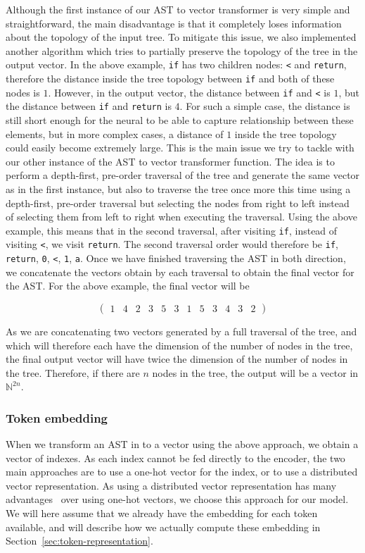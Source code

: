Although the first instance of our AST to vector transformer is very simple and
straightforward, the main disadvantage is that it completely loses information
about the topology of the input tree. To mitigate this issue, we also
implemented another algorithm which tries to partially preserve the topology of
the tree in the output vector. In the above example, \lstinline{if} has two
children nodes: \lstinline{<} and \lstinline{return}, therefore the distance
inside the tree topology between \lstinline{if} and both of these nodes is $1$.
However, in the output vector, the distance between \lstinline{if} and
\lstinline{<} is $1$, but the distance between \lstinline{if} and
\lstinline{return} is $4$. For such a simple case, the distance is still short
enough for the neural to be able to capture relationship between these elements,
but in more complex cases, a distance of $1$ inside the tree topology could
easily become extremely large. This is the main issue we try to tackle with our
other instance of the AST to vector transformer function. The idea is to perform
a depth-first, pre-order traversal of the tree and generate the same vector as
in the first instance, but also to traverse the tree once more this time using a
depth-first, pre-order traversal but selecting the nodes from right to left
instead of selecting them from left to right when executing the traversal. Using
the above example, this means that in the second traversal, after visiting
\lstinline{if}, instead of visiting \lstinline{<}, we visit \lstinline{return}.
The second traversal order would therefore be \lstinline{if},
\lstinline{return}, \lstinline{0}, \lstinline{<}, \lstinline{1}, \lstinline{a}.
Once we have finished traversing the AST in both direction, we concatenate the
vectors obtain by each traversal to obtain the final vector for the AST. For the
above example, the final vector will be

\[ \begin{pmatrix}1 & 4 & 2 & 3 & 5 & 3 & 1 & 5 & 3 & 4 & 3 & 2\end{pmatrix} \]

As we are concatenating two vectors generated by a full traversal of the tree,
and which will therefore each have the dimension of the number of nodes in the
tree, the final output vector will have twice the dimension of the number of
nodes in the tree. Therefore, if there are $n$ nodes in the tree, the output
will be a vector in $\mathbb{N}^{2n}$.
%
\subsubsection{Token embedding}
When we transform an AST in to a vector using the above approach, we obtain a
vector of indexes. As each index cannot be fed directly to the encoder, the two
main approaches are to use a one-hot vector for the index, or to use a
distributed vector representation. As using a distributed vector representation
has many advantages~\cite{DBLP:journals/corr/MikolovSCCD13} over using one-hot
vectors, we choose this approach for our model. We will here assume that we
already have the embedding for each token available, and will describe how we
actually compute these embedding in Section~\ref{sec:token-representation}.

